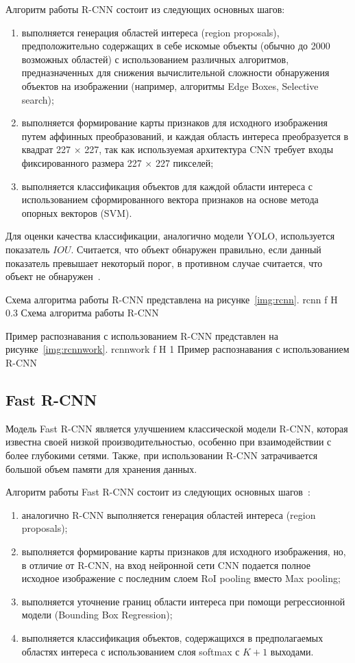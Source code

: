 Алгоритм работы R-CNN состоит из следующих основных шагов:
\begin{enumerate}
	\item выполняется генерация областей интереса (region proposals), предположительно содержащих в себе искомые объекты (обычно до 2000 возможных областей) с использованием различных алгоритмов, предназначенных для снижения вычислительной сложности обнаружения объектов на изображении (например, алгоритмы Edge Boxes, Selective search);
	\item выполняется формирование карты признаков для исходного изображения путем аффинных преобразований, и каждая область интереса преобразуется в квадрат 227 $\times$ 227,	так как используемая архитектура CNN требует входы фиксированного размера 227 $\times$ 227	пикселей;
	\item выполняется классификация объектов для каждой области интереса с использованием сформированного вектора признаков на основе метода опорных векторов (SVM).
\end{enumerate}
Для оценки качества классификации, аналогично модели YOLO, используется показатель $IOU$.
Считается, что объект обнаружен правильно, если данный показатель превышает некоторый порог, в противном случае считается, что объект не обнаружен~\cite{yolochina, rcnn}.

Схема алгоритма работы R-CNN представлена на рисунке~\ref{img:rcnn}.
	{rcnn}
	{f}
	{H}
	{0.3\textwidth}
	{Схема алгоритма работы R-CNN}

Пример распознавания с использованием R-CNN представлен на рисунке~\ref{img:rcnnwork}.
	{rcnnwork}
	{f}
	{H}
	{1\textwidth}
	{Пример распознавания с использованием R-CNN}

\subsection{Fast R-CNN}

Модель Fast R-CNN является улучшением классической модели R-CNN, которая известна своей низкой производительностью, особенно при взаимодействии с более глубокими сетями.
Также, при использовании R-CNN затрачивается большой объем памяти для хранения данных.

Алгоритм работы Fast R-CNN состоит из следующих основных шагов~\cite{yolochina, rcnn}:
\begin{enumerate}
	\item аналогично R-CNN выполняется генерация областей интереса (region proposals);
	\item выполняется формирование карты признаков для исходного изображения, но, в отличие от R-CNN, на вход нейронной сети CNN подается полное исходное изображение с последним слоем RoI pooling вместо Max pooling;
	\item выполняется уточнение границ области интереса при помощи регрессионной модели (Bounding Box Regression);
	\item выполняется классификация объектов, содержащихся в предполагаемых областях интереса с использованием слоя softmax с $K+1$ выходами.
\end{enumerate}

